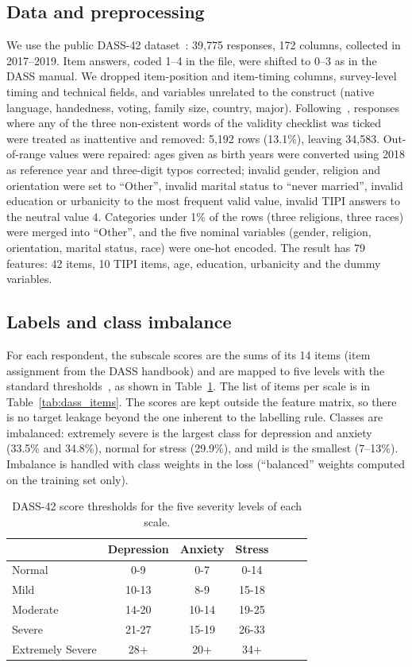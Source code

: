 \documentclass[conference,compsoc]{IEEEtran}
\begin{document}
\subsection{Data and preprocessing}
We use the public DASS-42 dataset~\cite{kaggle}: 39,775 responses, 172 columns, collected in 2017--2019.
Item answers, coded 1--4 in the file, were shifted to 0--3 as in the DASS manual.
We dropped item-position and item-timing columns, survey-level timing and technical fields, and variables unrelated to the construct (native language, handedness, voting, family size, country, major).
Following~\cite{shams}, responses where any of the three non-existent words of the validity checklist was ticked were treated as inattentive and removed: 5,192 rows (13.1\%), leaving 34,583.
Out-of-range values were repaired: ages given as birth years were converted using 2018 as reference year and three-digit typos corrected; invalid gender, religion and orientation were set to ``Other'', invalid marital status to ``never married'', invalid education or urbanicity to the most frequent valid value, invalid TIPI answers to the neutral value 4.
Categories under 1\% of the rows (three religions, three races) were merged into ``Other'', and the five nominal variables (gender, religion, orientation, marital status, race) were one-hot encoded.
The result has 79 features: 42 items, 10 TIPI items, age, education, urbanicity and the dummy variables.

\subsection{Labels and class imbalance}
For each respondent, the subscale scores are the sums of its 14 items (item assignment from the DASS handbook) and are mapped to five levels with the standard thresholds~\cite{lovibond}, as shown in Table~\ref{tab:dass_scoring}. The list of items per scale is in Table~\ref{tab:dass_items}.
The scores are kept outside the feature matrix, so there is no target leakage beyond the one inherent to the labelling rule.
Classes are imbalanced: extremely severe is the largest class for depression and anxiety (33.5\% and 34.8\%), normal for stress (29.9\%), and mild is the smallest (7--13\%).
Imbalance is handled with class weights in the loss (``balanced'' weights computed on the training set only).

\begin{table}[!t]
\centering
\caption{DASS-42 score thresholds for the five severity levels of each scale.}
\label{tab:dass_scoring}
\begin{tabular}{l cc cc cc}
\hline
 & Depression & Anxiety & Stress\\
\hline
Normal  & 0-9 & 0-7 & 0-14\\
Mild  & 10-13 & 8-9 & 15-18\\
Moderate  & 14-20 & 10-14 & 19-25\\
Severe  & 21-27 & 15-19 & 26-33\\
Extremely Severe  & 28+ & 20+ & 34+\\
\hline
\end{tabular}
\end{table}
\end{document}
